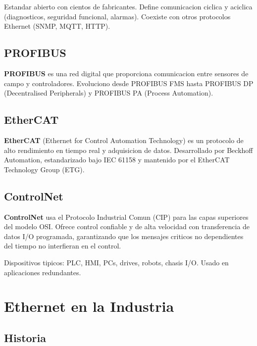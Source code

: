 Estandar abierto con cientos de fabricantes. Define comunicacion ciclica y aciclica (diagnosticos, seguridad funcional, alarmas). Coexiste con otros protocolos Ethernet (SNMP, MQTT, HTTP).

\subsection{PROFIBUS}

\begin{definicion}
\textbf{PROFIBUS} es una red digital que proporciona comunicacion entre sensores de campo y controladores. Evoluciono desde PROFIBUS FMS hasta PROFIBUS DP (Decentralised Peripherals) y PROFIBUS PA (Process Automation).
\end{definicion}

\subsection{EtherCAT}

\begin{definicion}
\textbf{EtherCAT} (Ethernet for Control Automation Technology) es un protocolo de alto rendimiento en tiempo real y adquisicion de datos. Desarrollado por Beckhoff Automation, estandarizado bajo IEC 61158 y mantenido por el EtherCAT Technology Group (ETG).
\end{definicion}

\subsection{ControlNet}

\begin{definicion}
\textbf{ControlNet} usa el Protocolo Industrial Comun (CIP) para las capas superiores del modelo OSI. Ofrece control confiable y de alta velocidad con transferencia de datos I/O programada, garantizando que los mensajes criticos no dependientes del tiempo no interfieran en el control.
\end{definicion}

Dispositivos tipicos: PLC, HMI, PCs, drives, robots, chasis I/O. Usado en aplicaciones redundantes.


\section{Ethernet en la Industria}

\subsection{Historia}

